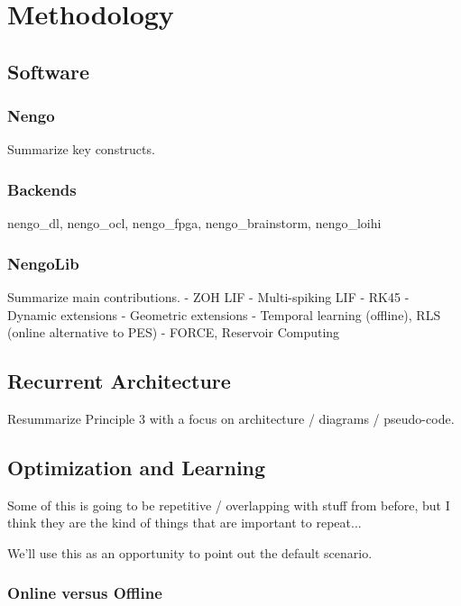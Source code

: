 \chapter{Methodology}
\label{chapt:methodology}


\section{Software}

\subsection{Nengo}

Summarize key constructs.

\subsection{Backends}

nengo\_dl, nengo\_ocl, nengo\_fpga, nengo\_brainstorm, nengo\_loihi

\subsection{NengoLib}

Summarize main contributions.
 - ZOH LIF
 - Multi-spiking LIF
 - RK45
 - Dynamic extensions
 - Geometric extensions
 - Temporal learning (offline), RLS (online alternative to PES)
 - FORCE, Reservoir Computing


\section{Recurrent Architecture}

Resummarize Principle 3 with a focus on architecture / diagrams / pseudo-code.


\section{Optimization and Learning}

Some of this is going to be repetitive / overlapping with stuff from before, but I think they are the kind of things that are important to repeat...

We'll use this as an opportunity to point out the default scenario.

\subsection{Online versus Offline}

